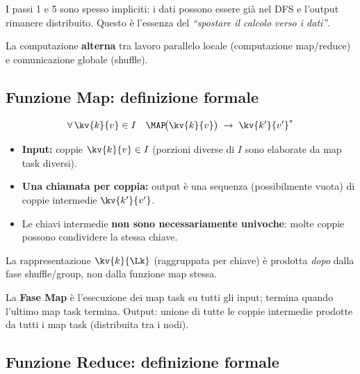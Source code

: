 \begin{nota}
  I passi 1 e 5 sono spesso impliciti: i dati possono essere già nel DFS
  e l'output rimanere distribuito. Questo è l'essenza del
  \emph{``spostare il calcolo verso i dati''}.
\end{nota}

\begin{takeaway}
  La computazione \textbf{alterna} tra lavoro parallelo locale
  (computazione map/reduce) e comunicazione globale (shuffle).
\end{takeaway}

\subsection{Funzione Map: definizione formale}

\begin{definizione}
  \[
    \forall\, \kv{k}{v} \in I \quad \MAP\!\bigl(\kv{k}{v}\bigr)
      \;\to\; \kv{k'}{v'}^{*}
  \]
  \begin{itemize}
    \item \textbf{Input:} coppie $\kv{k}{v} \in I$ (porzioni diverse di $I$
      sono elaborate da map task diversi).
    \item \textbf{Una chiamata per coppia:} output è una sequenza
      (possibilmente vuota) di coppie intermedie $\kv{k'}{v'}$.
    \item Le chiavi intermedie \textbf{non sono necessariamente univoche}:
      molte coppie possono condividere la stessa chiave.
  \end{itemize}
\end{definizione}

\begin{nota}
  La rappresentazione $\kv{k}{\Lk}$ (raggruppata per chiave) è prodotta
  \emph{dopo} dalla fase shuffle/group, non dalla funzione map stessa.
\end{nota}

La \textbf{Fase Map} è l'esecuzione dei map task su tutti gli input; termina
quando l'ultimo map task termina. Output: unione di tutte le coppie intermedie
prodotte da tutti i map task (distribuita tra i nodi).

\subsection{Funzione Reduce: definizione formale}

